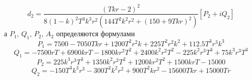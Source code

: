 \documentclass[12pt]{article}
\begin{document}
\begin{equation*}
    d_2=\frac{(T k r -2)^2}{8(1-k)^2 T^3 k^3 r^2 (144 T^2 k^2 r^2 + (150+9 T k r)^2)}[ P_2 + i Q_2]
\end{equation*}
а $P_1$, $Q_1$, $P_2$, $A_2$ определяются формулами
\begin{equation*}
    P_1 = 7500-7050 T k r +1200 T^2 r^2 k + 225 T^2 r^2 k^2 + 112.5 T^3 r^3 k^3
\end{equation*}
\begin{equation*}
   Q_1 = -7500 r T +6900 k r T-1800 k r^2 T^2 + 2400 k^2 r^2 T^2-225 k^2 r^3 T^3+75 k^3 r^3 T^3
\end{equation*}
\begin{equation*}
   P_2= 225 k^3 r^3 T^3+1350k^2 r^2 T^2 +1200 k r^2 T^2+1500 k r T-15000
\end{equation*}
\begin{equation*}
    Q_2=-150T^3 k^3 r^3-300 T^2 k^2 r^2 +900 T^2 k r^2  - 15600 T k r+15000 T r
\end{equation*}
\end{document}

